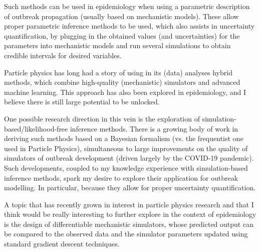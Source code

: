 \documentclass[11pt, a4paper]{awesome-cv}
\begin{document}
\begin{cvletter}
Such methods can be used in epidemiology when using a parametric description of outbreak propagation (usually based on mechanistic models). These allow proper parametric inference methods to be used, which also assists in uncertainty quantification, by plugging in the obtained values (and uncertainties) for the parameters into mechanistic models and run several simulations to obtain credible intervals for desired variables.




Particle physics has long had a story of using in its (data) analyses hybrid methods, which combine high-quality (mechanistic) simulators and advanced machine learning. This approach has also been explored in epidemiology, and I believe there is still large potential to be unlocked. 

One possible research direction in this vein is the exploration of simulation-based/likelihood-free inference methods. There is a growing body of work in deriving such methods based on a Bayesian formalism (vs. the frequentist one used in Particle Physics), simultaneous to large improvements on the quality of simulators of outbreak development (driven largely by the COVID-19 pandemic). Such developments, coupled to my knowledge experience with simulation-based inference methods, spark my desire to explore their application for outbreak modelling. In particular, because they allow for proper uncertainty quantification. %

A topic that has recently grown in interest in particle physics research and that I think would be really interesting to further explore in the context of epidemiology is the design of differentiable mechanistic simulators, whose predicted output can be compared to the observed data and the simulator parameters updated using standard gradient descent techniques.  %


\end{cvletter}
\end{document}
